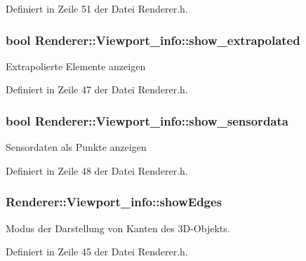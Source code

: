 Definiert in Zeile 51 der Datei Renderer.\-h.

\hypertarget{structRenderer_1_1Viewport__info_ac9d99216a6044d7048ba805f9f9b0815}{
\subsubsection[{show\-\_\-extrapolated}]{\setlength{\rightskip}{0pt plus 5cm}bool Renderer\-::\-Viewport\-\_\-info\-::show\-\_\-extrapolated}}\label{structRenderer_1_1Viewport__info_ac9d99216a6044d7048ba805f9f9b0815}
Extrapolierte Elemente anzeigen 

Definiert in Zeile 47 der Datei Renderer.\-h.

\hypertarget{structRenderer_1_1Viewport__info_abd0ab0f20c5acc43128634b4b4cc1f52}{
\subsubsection[{show\-\_\-sensordata}]{\setlength{\rightskip}{0pt plus 5cm}bool Renderer\-::\-Viewport\-\_\-info\-::show\-\_\-sensordata}}\label{structRenderer_1_1Viewport__info_abd0ab0f20c5acc43128634b4b4cc1f52}
Sensordaten als Punkte anzeigen 

Definiert in Zeile 48 der Datei Renderer.\-h.

\hypertarget{structRenderer_1_1Viewport__info_a61ce4c293d9dc97da9b4ed2f8f7a36e0}{
\subsubsection[{show\-Edges}]{ Renderer\-::\-Viewport\-\_\-info\-::show\-Edges}}\label{structRenderer_1_1Viewport__info_a61ce4c293d9dc97da9b4ed2f8f7a36e0}
Modus der Darstellung von Kanten des 3\-D-\/\-Objekts. 

Definiert in Zeile 45 der Datei Renderer.\-h.

